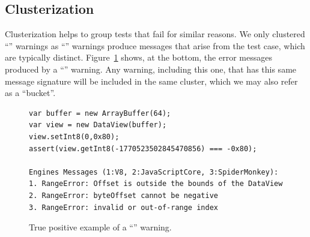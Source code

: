 \documentclass[10pt,conference,anonymous]{IEEEtran}
\begin{document}


\subsection{Clusterization}
\label{sec:clusterization}

Clusterization helps to group tests that fail for similar reasons. We
only clustered ``\lo'' warnings as ``\hi'' warnings produce messages
that arise from the test case, which are typically
distinct. Figure~\ref{fig:lo-truepositive} shows, at the bottom, the
error messages produced by a ``\lo'' warning. Any warning, including
this one, that has this same message signature will be included in the
same cluster, which we may also refer as a ``bucket''.

\begin{figure}[!h]
  \centering
  \begin{lstlisting}
var buffer = new ArrayBuffer(64);
var view = new DataView(buffer);
view.setInt8(0,0x80);
assert(view.getInt8(-1770523502845470856) === -0x80);

Engines Messages (1:V8, 2:JavaScriptCore, 3:SpiderMonkey):
1. RangeError: Offset is outside the bounds of the DataView
2. RangeError: byteOffset cannot be negative
3. RangeError: invalid or out-of-range index
  \end{lstlisting}
  \caption{\label{fig:lo-truepositive}True positive example of a ``\lo''
    warning.}
\end{figure}
\end{document}
